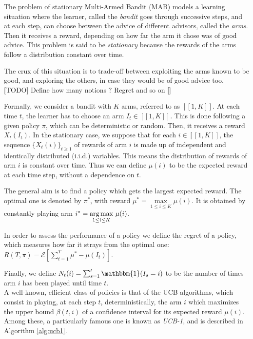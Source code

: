 The problem of stationary Multi-Armed Bandit (MAB) models a learning situation where the learner, called the \textit{bandit} goes through successive steps, and at each step, can choose between the advice of different advisors, called the \textit{arms}. Then it receives a reward, depending on how far the arm it chose was of good advice. This problem is said to be \textit{stationary} because the rewards of the arms follow a distribution constant over time.

The crux of this situation is to trade-off between exploiting the arms known to be good, and exploring the others, in case they would be of good advice too.\\

[TODO] Define how many notions ? Regret and so on []

Formally, we consider a bandit with $K$ arms, referred to as $[\![1,K]\!]$. At each time $t$, the learner has to choose an arm $I_t \in [\![1,K]\!]$. This is done following a given policy $\pi$, which can be deterministic or random. Then, it receives a reward $X_t(I_t)$. In the stationary case, we suppose that for each $i \in [\![1,K]\!]$, the sequence $\{X_t(i)\}_{t \geq 1}$ of rewards of arm $i$ is made up of independent and identically distributed (i.i.d.) variables. This means the distribution of rewards of arm $i$ is constant over time. Thus we can define $\mu(i)$ to be the expected reward at each time step, without a dependence on $t$.

The general aim is to find a policy which gets the largest expected reward. The optimal one is denoted by $\pi^*$, with reward $\mu^*=\underset{1\leq i \leq K}{\max} \mu(i)$. It is obtained by constantly playing arm $i^* = \underset{1\leq i \leq K}{\operatorname*{arg\,max}}\ \mu(i)$.

In order to assess the performance of a policy we define the regret of a policy, which measures how far it strays from the optimal one: $R(T,\pi)=\mathcal{E}\left[\sum_{t=1}^T \mu^* - \mu(I_t) \right]$.

Finally, we define $N_t(i)=\sum_{s=1}^t \mathbbm{1}(I_s=i)$ to be the number of times arm $i$ has been played until time $t$.\\

A well-known, efficient class of policies is that of the UCB	algorithms, which consist in playing, at each step $t$, deterministically, the arm $i$ which maximizes the upper bound $\beta(t,i)$ of a confidence interval for its expected reward $\mu(i)$.
Among these, a particularly famous one is known as \textit{UCB-1}, and is described in Algorithm \ref{alg:ucb1}.

